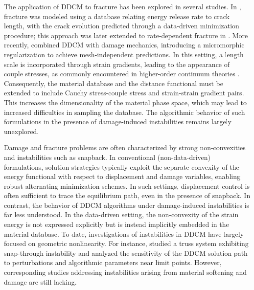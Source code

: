 \documentclass[10pt,review]{cas-sc}
\begin{document}
The application of DDCM to fracture has been explored in several studies. In \cite{Carrara2020}, fracture was modeled using a database relating energy release rate to crack length, with the crack evolution predicted through a data-driven minimization procedure; this approach was later extended to rate-dependent fracture in \cite{Carrara2021}. More recently, \cite{Ulloa2024} combined DDCM with damage mechanics, introducing a micromorphic regularization to achieve mesh-independent predictions. In this setting, a length scale is incorporated through strain gradients, leading to the appearance of couple stresses, as commonly encountered in higher-order continuum theories \cite{Mindlin1968,Xia1996}. Consequently, the material database and the distance functional must be extended to include Cauchy stress-couple stress and strain-strain gradient pairs. This increases the dimensionality of the material phase space, which may lead to increased difficulties in sampling the database. The algorithmic behavior of such formulations in the presence of damage-induced instabilities remains largely unexplored.

Damage and fracture problems are often characterized by strong non-convexities and instabilities such as snapback. In conventional (non-data-driven) formulations, solution strategies typically exploit the separate convexity of the energy functional with respect to displacement and damage variables, enabling robust alternating minimization schemes. In such settings, displacement control is often sufficient to trace the equilibrium path, even in the presence of snapback. In contrast, the behavior of DDCM algorithms under damage-induced instabilities is far less understood. In the data-driven setting, the non-convexity of the strain energy is not expressed explicitly but is instead implicitly embedded in the material database. To date, investigations of instabilities in DDCM have largely focused on geometric nonlinearity. For instance, \cite{Kuang2023} studied a truss system exhibiting snap-through instability and analyzed the sensitivity of the DDCM solution path to perturbations and algorithmic parameters near limit points. However, corresponding studies addressing instabilities arising from material softening and damage are still lacking.
\end{document}
